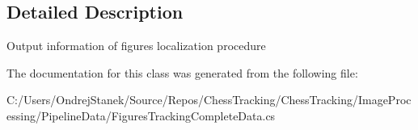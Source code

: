 \subsection{Detailed Description}
Output information of figures localization procedure 



The documentation for this class was generated from the following file\+:\begin{DoxyCompactItemize}
\item 
C\+:/\+Users/\+Ondrej\+Stanek/\+Source/\+Repos/\+Chess\+Tracking/\+Chess\+Tracking/\+Image\+Processing/\+Pipeline\+Data/Figures\+Tracking\+Complete\+Data.\+cs\end{DoxyCompactItemize}
